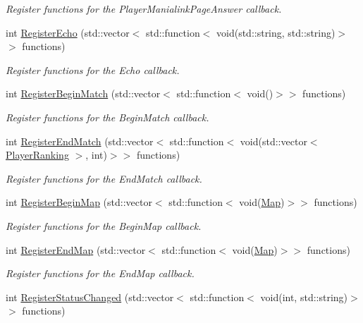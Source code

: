 \begin{DoxyCompactItemize}
\begin{DoxyCompactList}\small\item\em Register functions for the Player\-Manialink\-Page\-Answer callback. \end{DoxyCompactList}\item 
int \hyperlink{classEventManager_aee6fe2f94e1c86af6ec79735771701d0}{Register\-Echo} (std\-::vector$<$ std\-::function$<$ void(std\-::string, std\-::string)$>$$>$ functions)
\begin{DoxyCompactList}\small\item\em Register functions for the Echo callback. \end{DoxyCompactList}\item 
int \hyperlink{classEventManager_afb7b0d6fd646ce3eb0568c95c8a4b89c}{Register\-Begin\-Match} (std\-::vector$<$ std\-::function$<$ void()$>$$>$ functions)
\begin{DoxyCompactList}\small\item\em Register functions for the Begin\-Match callback. \end{DoxyCompactList}\item 
int \hyperlink{classEventManager_a3d109b973ec50e1a06475b86f005f345}{Register\-End\-Match} (std\-::vector$<$ std\-::function$<$ void(std\-::vector$<$ \hyperlink{structPlayerRanking}{Player\-Ranking} $>$, int)$>$$>$ functions)
\begin{DoxyCompactList}\small\item\em Register functions for the End\-Match callback. \end{DoxyCompactList}\item 
int \hyperlink{classEventManager_ae77dfbbb9640ca9aa5b458d6959676ea}{Register\-Begin\-Map} (std\-::vector$<$ std\-::function$<$ void(\hyperlink{structMap}{Map})$>$$>$ functions)
\begin{DoxyCompactList}\small\item\em Register functions for the Begin\-Map callback. \end{DoxyCompactList}\item 
int \hyperlink{classEventManager_aa8cff04bd5efe5933b99e9cd4d2862d3}{Register\-End\-Map} (std\-::vector$<$ std\-::function$<$ void(\hyperlink{structMap}{Map})$>$$>$ functions)
\begin{DoxyCompactList}\small\item\em Register functions for the End\-Map callback. \end{DoxyCompactList}\item 
int \hyperlink{classEventManager_ad84c001cc738faa396aaa5948573b682}{Register\-Status\-Changed} (std\-::vector$<$ std\-::function$<$ void(int, std\-::string)$>$$>$ functions)

\end{DoxyCompactItemize}
